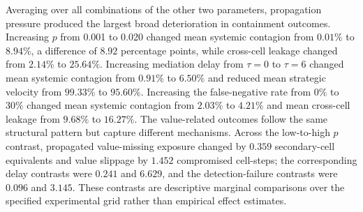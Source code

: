 Averaging over all combinations of the other two parameters, propagation pressure produced the largest broad deterioration in containment outcomes.
Increasing \(p\) from 0.001 to 0.020 changed mean systemic contagion from \(0.01\%\) to \(8.94\%\), a difference of \(8.92\) percentage points, while cross-cell leakage changed from \(2.14\%\) to \(25.64\%\).
Increasing mediation delay from \(\tau=0\) to \(\tau=6\) changed mean systemic contagion from \(0.91\%\) to \(6.50\%\) and reduced mean strategic velocity from \(99.33\%\) to \(95.60\%\).
Increasing the false-negative rate from \(0\%\) to \(30\%\) changed mean systemic contagion from \(2.03\%\) to \(4.21\%\) and mean cross-cell leakage from \(9.68\%\) to \(16.27\%\).
The value-related outcomes follow the same structural pattern but capture different mechanisms.
Across the low-to-high \(p\) contrast, propagated value-missing exposure changed by \(0.359\) secondary-cell equivalents and value slippage by \(1.452\) compromised cell-steps; the corresponding delay contrasts were \(0.241\) and \(6.629\), and the detection-failure contrasts were \(0.096\) and \(3.145\).
These contrasts are descriptive marginal comparisons over the specified experimental grid rather than empirical effect estimates.
